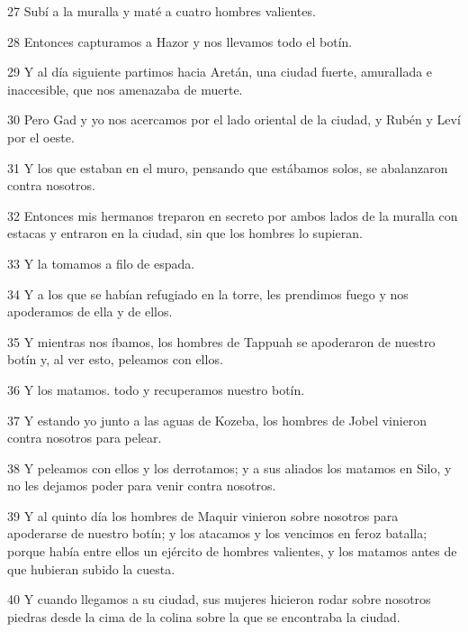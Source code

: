 \par 27 Subí a la muralla y maté a cuatro hombres valientes.

\par 28 Entonces capturamos a Hazor y nos llevamos todo el botín.

\par 29 Y al día siguiente partimos hacia Aretán, una ciudad fuerte, amurallada e inaccesible, que nos amenazaba de muerte.

\par 30 Pero Gad y yo nos acercamos por el lado oriental de la ciudad, y Rubén y Leví por el oeste.

\par 31 Y los que estaban en el muro, pensando que estábamos solos, se abalanzaron contra nosotros.

\par 32 Entonces mis hermanos treparon en secreto por ambos lados de la muralla con estacas y entraron en la ciudad, sin que los hombres lo supieran.

\par 33 Y la tomamos a filo de espada.

\par 34 Y a los que se habían refugiado en la torre, les prendimos fuego y nos apoderamos de ella y de ellos.

\par 35 Y mientras nos íbamos, los hombres de Tappuah se apoderaron de nuestro botín y, al ver esto, peleamos con ellos.

\par 36 Y los matamos. todo y recuperamos nuestro botín.

\par 37 Y estando yo junto a las aguas de Kozeba, los hombres de Jobel vinieron contra nosotros para pelear.

\par 38 Y peleamos con ellos y los derrotamos; y a sus aliados los matamos en Silo, y no les dejamos poder para venir contra nosotros.

\par 39 Y al quinto día los hombres de Maquir vinieron sobre nosotros para apoderarse de nuestro botín; y los atacamos y los vencimos en feroz batalla; porque había entre ellos un ejército de hombres valientes, y los matamos antes de que hubieran subido la cuesta.

\par 40 Y cuando llegamos a su ciudad, sus mujeres hicieron rodar sobre nosotros piedras desde la cima de la colina sobre la que se encontraba la ciudad.

